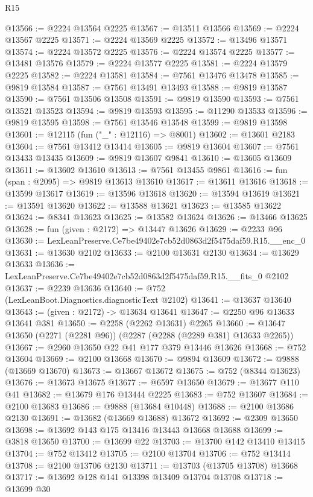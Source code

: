 \begin{lexlean}{R15}
\begin{coremodule}
@13566 := @2224 @13564 @2225
@13567 := @13511 @13566
@13569 := @2224 @13567 @2225
@13571 := @2224 @13569 @2225
@13572 := @13496 @13571
@13574 := @2224 @13572 @2225
@13576 := @2224 @13574 @2225
@13577 := @13481 @13576
@13579 := @2224 @13577 @2225
@13581 := @2224 @13579 @2225
@13582 := @2224 @13581
@13584 := @7561 @13476 @13478
@13585 := @9819 @13584
@13587 := @7561 @13491 @13493
@13588 := @9819 @13587
@13590 := @7561 @13506 @13508
@13591 := @9819 @13590
@13593 := @7561 @13521 @13523
@13594 := @9819 @13593
@13595 := @11290 @13533
@13596 := @9819 @13595
@13598 := @7561 @13546 @13548
@13599 := @9819 @13598
@13601 := @12115 (fun ("_" : @12116) => @8001)
@13602 := @13601 @2183
@13604 := @7561 @13412 @13414
@13605 := @9819 @13604
@13607 := @7561 @13433 @13435
@13609 := @9819 @13607 @9841
@13610 := @13605 @13609
@13611 := @13602 @13610
@13613 := @7561 @13455 @9861
@13616 := fun (span : @2095) => @9819 @13613 @13610
@13617 := @13611 @13616
@13618 := @13599 @13617
@13619 := @13596 @13618
@13620 := @13594 @13619
@13621 := @13591 @13620
@13622 := @13588 @13621
@13623 := @13585 @13622
@13624 := @8341 @13623
@13625 := @13582 @13624
@13626 := @13466 @13625
@13628 := fun (given : @2172) => @13447 @13626
@13629 := @2233 @96
@13630 := LexLeanPreserve.Ce7be49402e7cb52d0863d2f5475daf59.R15.__enc_0
@13631 := @13630 @2102
@13633 := @2100 @13631 @2130
@13634 := @13629 @13633
@13636 := LexLeanPreserve.Ce7be49402e7cb52d0863d2f5475daf59.R15.__fits_0 @2102
@13637 := @2239 @13636
@13640 := @752 (LexLeanBoot.Diagnostics.diagnosticText @2102)
@13641 := @13637 @13640
@13643 := (given : @2172) -> @13634 @13641
@13647 := @2250 @96 @13633 @13641 @381
@13650 := @2258 (@2262 @13631) @2265
@13660 := @13647 @13650 (@2271 (@2281 @96)) (@2287 (@2288 (@2289 @381) @13633 @2265))
@13667 := @2960 @13650 @22 @41 @177 @379 @13446 @13626
@13668 := @752 @13604
@13669 := @2100 @13668
@13670 := @9894 @13609
@13672 := @9888 (@13669 @13670)
@13673 := @13667 @13672
@13675 := @752 (@8344 @13623)
@13676 := @13673 @13675
@13677 := @6597 @13650
@13679 := @13677 @110 @41
@13682 := @13679 @176 @13444 @2225
@13683 := @752 @13607
@13684 := @2100 @13683
@13686 := @9888 (@13684 @10448)
@13688 := @2100 @13686 @2130
@13691 := @13682 (@13669 @13688) @13672
@13692 := @2309 @13650
@13698 := @13692 @143 @175 @13416 @13443 @13668 @13688
@13699 := @3818 @13650
@13700 := @13699 @22
@13703 := @13700 @142 @13410 @13415
@13704 := @752 @13412
@13705 := @2100 @13704
@13706 := @752 @13414
@13708 := @2100 @13706 @2130
@13711 := @13703 (@13705 @13708) @13668
@13717 := @13692 @128 @141 @13398 @13409 @13704 @13708
@13718 := @13699 @30

\end{coremodule}
\end{lexlean}
